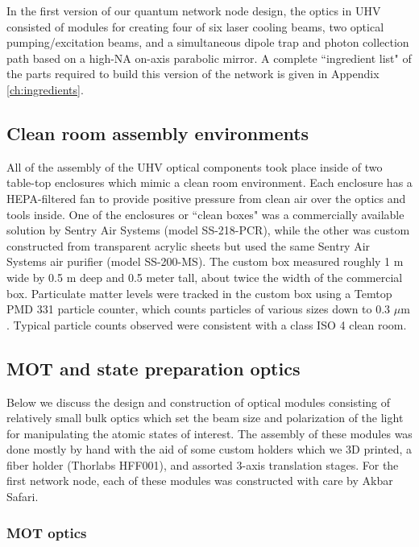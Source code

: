In the first version of our quantum network node design, the optics in UHV consisted of modules for creating four of six laser cooling beams, two optical pumping/excitation beams, and a simultaneous dipole trap and photon collection path based on a high-NA on-axis parabolic mirror. A complete ``ingredient list" of the parts required to build this version of the network is given in Appendix \ref{ch:ingredients}.

\subsection{Clean room assembly environments}

All of the assembly of the UHV optical components took place inside of two table-top enclosures which mimic a clean room environment. Each enclosure has a HEPA-filtered fan to provide positive pressure from clean air over the optics and tools inside. One of the enclosures or ``clean boxes" was a commercially available solution by Sentry Air Systems (model SS-218-PCR), while the other was custom constructed from transparent acrylic sheets but used the same Sentry Air Systems air purifier (model SS-200-MS). The custom box measured roughly 1 m wide by 0.5 m deep and 0.5 meter tall, about twice the width of the commercial box. Particulate matter levels were tracked in the custom box using a Temtop PMD 331 particle counter, which counts particles of various sizes down to 0.3 $\mu \mathrm{m}$. Typical particle counts observed were consistent with a class ISO 4 clean room.

\subsection{MOT and state preparation optics}
Below we discuss the design and construction of optical modules consisting of relatively small bulk optics which set the beam size and polarization of the light for manipulating the atomic states of interest. The assembly of these modules was done mostly by hand with the aid of some custom holders which we 3D printed, a fiber holder (Thorlabs HFF001), and assorted 3-axis translation stages. For the first network node, each of these modules was constructed with care by Akbar Safari.

\subsubsection{MOT optics}

